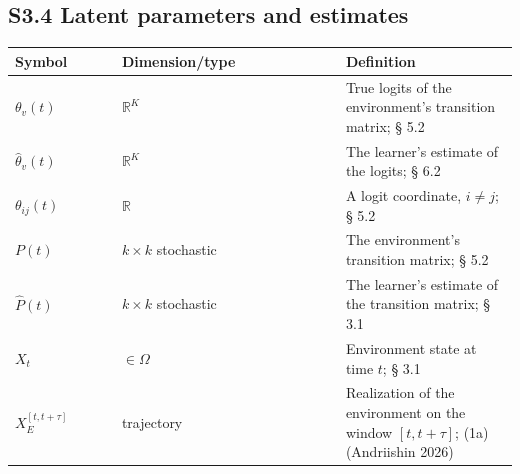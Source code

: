 \documentclass[pdflatex,sn-mathphys-ay]{sn-jnl}
\begin{document}
\subsection*{S3.4 Latent parameters and estimates}\label{s3.4-latent-parameters-and-estimates}



\begin{center}\small
\begin{tabular}{@{} >{\raggedright\arraybackslash}p{0.2105\linewidth} >{\raggedright\arraybackslash}p{0.4474\linewidth} >{\raggedright\arraybackslash}p{0.3421\linewidth}@{}}
\toprule

\begin{minipage}[b]{\linewidth}\raggedright

Symbol

\end{minipage} & \begin{minipage}[b]{\linewidth}\raggedright

Dimension/type

\end{minipage} & \begin{minipage}[b]{\linewidth}\raggedright

Definition

\end{minipage} \\

\midrule

\(\theta_v(t)\) & \(\mathbb{R}^K\) & True logits of the environment's transition matrix; § 5.2 \\

\(\hat\theta_v(t)\) & \(\mathbb{R}^K\) & The learner's estimate of the logits; § 6.2 \\

\(\theta_{ij}(t)\) & \(\mathbb{R}\) & A logit coordinate, \(i \ne j\); § 5.2 \\

\(P(t)\) & \(k \times k\) stochastic & The environment's transition matrix; § 5.2 \\

\(\hat P(t)\) & \(k \times k\) stochastic & The learner's estimate of the transition matrix; § 3.1 \\

\(X_t\) & \(\in \Omega\) & Environment state at time \(t\); § 3.1 \\

\(X_E^{[t, t+\tau]}\) & trajectory & Realization of the environment on the window \([t, t+\tau]\); (1a) (Andriishin 2026) \\

\bottomrule
\end{tabular}
\end{center}
\end{document}
